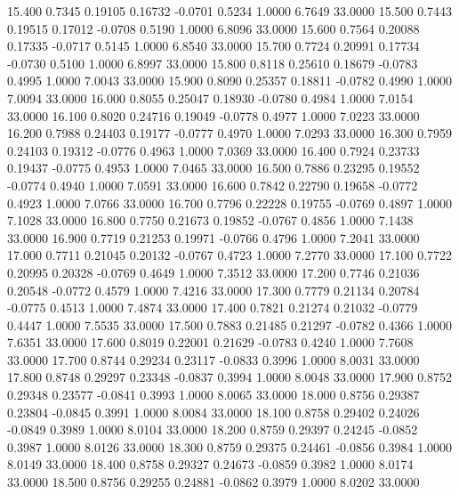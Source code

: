   15.400   0.7345   0.19105   0.16732  -0.0701   0.5234   1.0000   6.7649  33.0000
  15.500   0.7443   0.19515   0.17012  -0.0708   0.5190   1.0000   6.8096  33.0000
  15.600   0.7564   0.20088   0.17335  -0.0717   0.5145   1.0000   6.8540  33.0000
  15.700   0.7724   0.20991   0.17734  -0.0730   0.5100   1.0000   6.8997  33.0000
  15.800   0.8118   0.25610   0.18679  -0.0783   0.4995   1.0000   7.0043  33.0000
  15.900   0.8090   0.25357   0.18811  -0.0782   0.4990   1.0000   7.0094  33.0000
  16.000   0.8055   0.25047   0.18930  -0.0780   0.4984   1.0000   7.0154  33.0000
  16.100   0.8020   0.24716   0.19049  -0.0778   0.4977   1.0000   7.0223  33.0000
  16.200   0.7988   0.24403   0.19177  -0.0777   0.4970   1.0000   7.0293  33.0000
  16.300   0.7959   0.24103   0.19312  -0.0776   0.4963   1.0000   7.0369  33.0000
  16.400   0.7924   0.23733   0.19437  -0.0775   0.4953   1.0000   7.0465  33.0000
  16.500   0.7886   0.23295   0.19552  -0.0774   0.4940   1.0000   7.0591  33.0000
  16.600   0.7842   0.22790   0.19658  -0.0772   0.4923   1.0000   7.0766  33.0000
  16.700   0.7796   0.22228   0.19755  -0.0769   0.4897   1.0000   7.1028  33.0000
  16.800   0.7750   0.21673   0.19852  -0.0767   0.4856   1.0000   7.1438  33.0000
  16.900   0.7719   0.21253   0.19971  -0.0766   0.4796   1.0000   7.2041  33.0000
  17.000   0.7711   0.21045   0.20132  -0.0767   0.4723   1.0000   7.2770  33.0000
  17.100   0.7722   0.20995   0.20328  -0.0769   0.4649   1.0000   7.3512  33.0000
  17.200   0.7746   0.21036   0.20548  -0.0772   0.4579   1.0000   7.4216  33.0000
  17.300   0.7779   0.21134   0.20784  -0.0775   0.4513   1.0000   7.4874  33.0000
  17.400   0.7821   0.21274   0.21032  -0.0779   0.4447   1.0000   7.5535  33.0000
  17.500   0.7883   0.21485   0.21297  -0.0782   0.4366   1.0000   7.6351  33.0000
  17.600   0.8019   0.22001   0.21629  -0.0783   0.4240   1.0000   7.7608  33.0000
  17.700   0.8744   0.29234   0.23117  -0.0833   0.3996   1.0000   8.0031  33.0000
  17.800   0.8748   0.29297   0.23348  -0.0837   0.3994   1.0000   8.0048  33.0000
  17.900   0.8752   0.29348   0.23577  -0.0841   0.3993   1.0000   8.0065  33.0000
  18.000   0.8756   0.29387   0.23804  -0.0845   0.3991   1.0000   8.0084  33.0000
  18.100   0.8758   0.29402   0.24026  -0.0849   0.3989   1.0000   8.0104  33.0000
  18.200   0.8759   0.29397   0.24245  -0.0852   0.3987   1.0000   8.0126  33.0000
  18.300   0.8759   0.29375   0.24461  -0.0856   0.3984   1.0000   8.0149  33.0000
  18.400   0.8758   0.29327   0.24673  -0.0859   0.3982   1.0000   8.0174  33.0000
  18.500   0.8756   0.29255   0.24881  -0.0862   0.3979   1.0000   8.0202  33.0000
